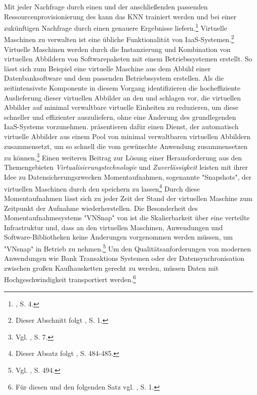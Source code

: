 Mit jeder Nachfrage durch einen \CSU und der anschließenden passenden Ressourcenprovisionierung des \CSPs kann das KNN trainiert werden und bei einer zukünftigen Nachfrage durch einen \CSU genauere Ergebnisse liefern.\footnote{\cite{Kousiouris.2012}, S. 4.}
\newline
\newline
Virtuelle Maschinen zu verwalten ist eine übliche Funktionalität von \acs{IaaS}-Systemen.\footnote{Dieser Abschnitt folgt \cite{Kecskemeti.2013}, S. 1.}
Virtuelle Maschinen werden durch die Instanzierung und Kombination von virtuellen Abbildern von Softwarepaketen mit einem Betriebssystemen erstellt. 
So lässt sich zum Beispiel eine virtuelle Maschine aus dem Abbild einer Datenbanksoftware und dem passenden Betriebssystem erstellen. 
Als die zeitintensivste Komponente in diesem Vorgang identifizieren \cite{Kecskemeti.2013} die hocheffiziente Auslieferung dieser virtuellen Abbilder an den \CSU und schlagen vor, die virtuellen Abbilder auf minimal verwaltbare virtuelle Einheiten zu reduzieren, um diese schneller und effizienter auszuliefern, ohne eine Änderung des grundlegenden \acs{IaaS}-Systems vorzunehmen.
\cite{Kecskemeti.2013} präsentieren dafür einen Dienst, der automatisch virtuelle Abbilder aus einem Pool von minimal verwaltbaren virtuellen Abbildern zusammensetzt, um so schnell die vom \CSU gewünschte Anwendung zusammensetzen zu können.\footnote{Vgl. \cite{Kecskemeti.2013}, S. 7.}
\newline
Einen weiteren Beitrag zur Lösung einer Herausforderung aus den Themengebieten \emph{Virtualisierungstechnologie} und \emph{Zuverlässigkeit} leisten \cite{Kangarlou.2012} mit ihrer Idee zu Datensicherungszwecken Momentaufnahmen, sogenannte "Snapshots", der virtuellen Maschinen durch den \CSP speichern zu lassen\footnote{Dieser Absatz folgt \cite{Kangarlou.2012}, S. 484-485.}
Durch diese Momentaufnahmen lässt sich zu jeder Zeit der Stand der virtuellen Maschine zum Zeitpunkt der Aufnahme wiederherstellen. 
Die Besonderheit des Momentaufnahmesystems "VNSnap" von \cite{Kangarlou.2012} ist die Skalierbarkeit über eine verteilte \CC Infrastruktur und, dass an den virtuellen Maschinen, Anwendungen und Software-Bibliotheken keine Änderungen vorgenommen werden müssen, um "VNsnap" in Betrieb zu nehmen.\footnote{Vgl. \cite{Kangarlou.2012}, S. 494.}
\newline
\newline
Um den Qualitätsanforderungen von modernen Anwendungen wie Bank Transaktions Systemen oder der Datensynchronisation zwischen großen Kaufhausketten gerecht zu werden, müssen Daten mit Hochgeschwindigkeit transportiert werden.\footnote{Für diesen und den folgenden Satz vgl. \cite{Liu.2012}, S. 1.}
